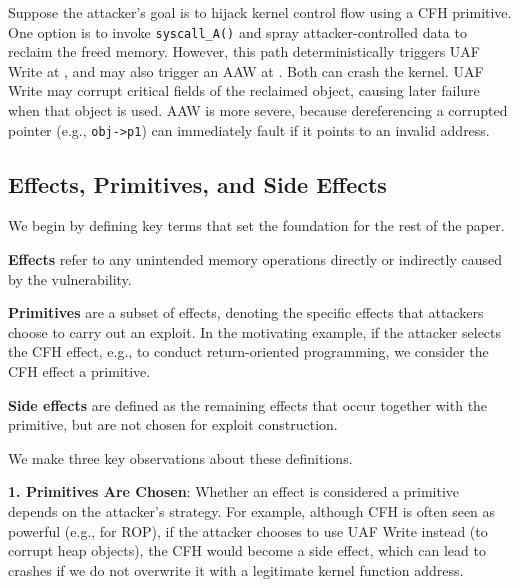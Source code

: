 Suppose the attacker’s goal is to hijack kernel control flow using a CFH primitive. One option is to invoke \texttt{syscall\_A()} and spray attacker-controlled data to reclaim the freed memory. However, this path deterministically triggers UAF Write at , and may also trigger an AAW at . 
Both can crash the kernel. UAF Write may corrupt critical fields of the reclaimed object, causing later failure when that object is used. AAW is more severe, because dereferencing a corrupted pointer (e.g., \texttt{obj->p1}) can immediately fault if it points to an invalid address.


\subsection{Effects, Primitives, and Side Effects} \label{chap:eps}

We begin by defining key terms that set the foundation for the rest of the paper.

\textbf{Effects} refer to any unintended memory operations directly or indirectly caused by the vulnerability.

\textbf{Primitives} are a subset of effects, denoting the specific effects that attackers choose to carry out an exploit. In the motivating example, if the attacker selects the CFH effect, e.g., to conduct return-oriented programming, we consider the CFH effect a primitive.

\textbf{Side effects} are defined as the remaining effects that occur together with the primitive, but are not chosen for exploit construction.

We make three key observations about these definitions.

\noindent\textbf{1. Primitives Are Chosen}: Whether an effect is considered a primitive depends on the attacker's strategy. For example, although CFH is often seen as powerful (e.g., for ROP), if the attacker chooses to use UAF Write instead (to corrupt heap objects), the CFH would become a side effect, which can lead to crashes if we do not overwrite it with a legitimate kernel function address.

